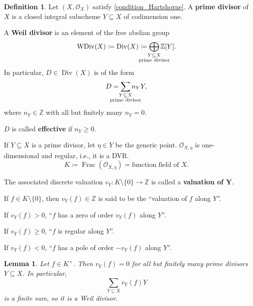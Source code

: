 \documentclass[12pt]{article}
\DeclareMathOperator{\Frac}{Frac}
\DeclareMathOperator{\WDiv}{WDiv}
\DeclareMathOperator{\Div}{Div}
\newtheorem*{lemma}{Lemma}
\theoremstyle{definition}
\newtheorem*{definition}{Definition}
\theoremstyle{remark}
\begin{document}
\begin{definition}
Let $(X,\mathcal{O}_X)$ satisfy \eqref{condition_Hartshorne}. A \textbf{prime divisor} of $X$ is a closed integral subscheme $Y\subseteq X$ of codimension one.

A \textbf{Weil divisor} is an element of the free abelian group
\[\WDiv(X)\coloneqq\Div(X)\coloneqq\bigoplus_{\mathclap{\substack{Y\subseteq X\\\text{prime divisor}}}}\mathbb{Z}[Y].\]
In particular, $D\in\Div(X)$ is of the form
\[D=\sum_{\mathclap{\substack{Y\subseteq X\\\text{prime divisor}}}}n_YY,\]
where $n_Y\in\mathbb{Z}$ with all but finitely many $n_Y=0$.

$D$ is called \textbf{effective} if $n_Y\geq0$.

If $Y\subseteq X$ is a prime divisor, let $\eta\in Y$ be the generic point. $\mathcal{O}_{X,\eta}$ is one-dimensional and regular, i.e., it is a DVR.
\[K\coloneqq\Frac(\mathcal{O}_{X,\eta})=\text{function field of }X.\]

The associated discrete valuation $v_Y:K\setminus\{0\}\rightarrow\mathbb{Z}$ is called a \textbf{valuation of $\boldsymbol{Y}$}.

If $f\in K\setminus\{0\}$, then $v_Y(f)\in\mathbb{Z}$ is said to be the ``valuation of $f$ along $Y$''.

If $v_Y(f)>0$, ``$f$ has a zero of order $v_Y(f)$ along $Y$''.

If $v_Y(f)\geq0$, ``$f$ is regular along $Y$''.

If $v_Y(f)<0$, ``$f$ has a pole of order $-v_Y(f)$ along $Y$''.
\end{definition}

\begin{lemma}
Let $f\in K^{\times}$. Then $v_Y(f)=0$ for all but finitely many prime divisors $Y\subseteq X$. In particular,
\[\sum_{Y\subseteq X}v_Y(f)Y\]
is a finite sum, so it is a Weil divisor.
\end{lemma}
\end{document}
